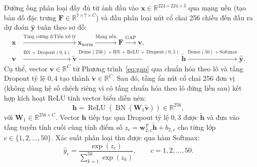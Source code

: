 Đường ống phân loại đầy đủ từ ảnh đầu vào $\mathbf{x} \in \mathbb{R}^{224 \times 224 \times 3}$ qua mạng nền (tạo bản đồ đặc trưng $\mathbf{F} \in \mathbb{R}^{7 \times 7 \times C}$) và đầu phân loại nút cổ chai 256 chiều đến đầu ra dự đoán $\hat{\mathbf{y}}$ tuân theo sơ đồ:
\begin{equation}
\begin{aligned}
    \mathbf{x}
    &\xrightarrow{\text{Tăng cường \& Tiền xử lý}} \mathbf{x}_{\mathrm{norm}}
    \xrightarrow{\text{Mạng nền}} \mathbf{F}
    \xrightarrow{\text{GAP}} \mathbf{v},\\
    \mathbf{v}
    &\xrightarrow{\text{BN + Dropout}(0{,}4)} \tilde{\mathbf{v}}
    \xrightarrow{\text{Dense}(256) + \text{BN + ReLU + Dropout}(0{,}3)} \tilde{\mathbf{h}}
    \xrightarrow{\text{Dense}(50) + \text{Softmax}} \hat{\mathbf{y}}.
\end{aligned}
\label{eq:bottleneck-pipeline}
\end{equation}
Cụ thể, vector $\mathbf{v} \in \mathbb{R}^C$ từ Phương trình~\eqref{eq:gap} qua chuẩn hóa theo lô và tầng Dropout tỷ lệ $0{,}4$ tạo thành $\tilde{\mathbf{v}} \in \mathbb{R}^C$. Sau đó, tầng ẩn nút cổ chai 256 đơn vị (không dùng hệ số chệch riêng vì có tầng chuẩn hóa theo lô đứng liền sau) kết hợp kích hoạt ReLU tính vector biểu diễn nén:
\begin{equation}
    \mathbf{h} = \operatorname{ReLU}\left(\operatorname{BN}\left(\mathbf{W}_1 \tilde{\mathbf{v}}\right)\right) \in \mathbb{R}^{256},
    \label{eq:bottleneck-hidden}
\end{equation}
với $\mathbf{W}_1 \in \mathbb{R}^{256 \times C}$. Vector $\mathbf{h}$ tiếp tục qua Dropout tỷ lệ $0{,}3$ được $\tilde{\mathbf{h}}$ và đưa vào tầng tuyến tính cuối cùng tính điểm số $z_c = \mathbf{w}_{2,c}^T \tilde{\mathbf{h}} + b_{2,c}$ cho từng lớp $c \in \{1, 2, \dots, 50\}$. Xác suất phân loại thu được qua hàm Softmax:
\begin{equation}
    \hat{y}_c = \frac{\exp(z_c)}{\sum_{k=1}^{50} \exp(z_k)}, \qquad c = 1, 2, \dots, 50.
    \label{eq:softmax-50}
\end{equation}

